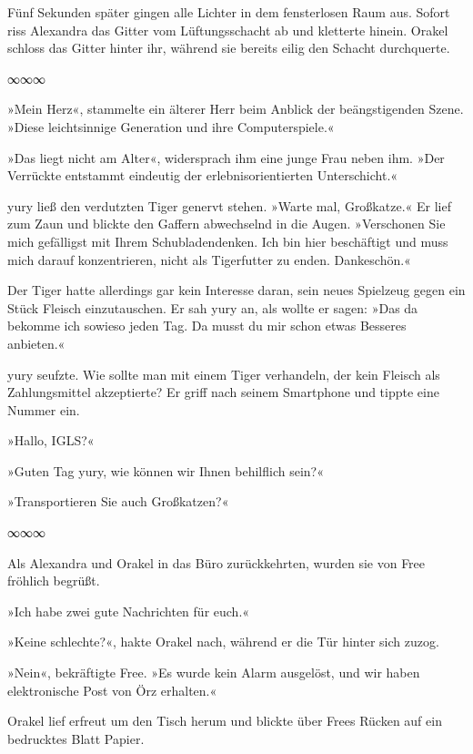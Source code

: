 Fünf Sekunden später gingen alle Lichter in dem fensterlosen Raum aus. Sofort riss Alexandra das Gitter vom Lüftungsschacht ab und kletterte hinein. Orakel schloss das Gitter hinter ihr, während sie bereits eilig den Schacht durchquerte.

\begin{center}
	∞∞∞
\end{center}

»Mein Herz«, stammelte ein älterer Herr beim Anblick der beängstigenden Szene. »Diese leichtsinnige Generation und ihre Computerspiele.«

»Das liegt nicht am Alter«, widersprach ihm eine junge Frau neben ihm. »Der Verrückte entstammt eindeutig der erlebnisorientierten Unterschicht.«

yury ließ den verdutzten Tiger genervt stehen. »Warte mal, Großkatze.« Er lief zum Zaun und blickte den Gaffern abwechselnd in die Augen. »Verschonen Sie mich gefälligst mit Ihrem Schubladendenken. Ich bin hier beschäftigt und muss mich darauf konzentrieren, nicht als Tigerfutter zu enden. Dankeschön.«

Der Tiger hatte allerdings gar kein Interesse daran, sein neues Spielzeug gegen ein Stück Fleisch einzutauschen. Er sah yury an, als wollte er sagen: »Das da bekomme ich sowieso jeden Tag. Da musst du mir schon etwas Besseres anbieten.«

yury seufzte. Wie sollte man mit einem Tiger verhandeln, der kein Fleisch als Zahlungsmittel akzeptierte? Er griff nach seinem Smartphone und tippte eine Nummer ein.

»Hallo, IGLS?«

»Guten Tag yury, wie können wir Ihnen behilflich sein?«

»Transportieren Sie auch Großkatzen?«

\begin{center}
	∞∞∞
\end{center}

Als Alexandra und Orakel in das Büro zurückkehrten, wurden sie von Free fröhlich begrüßt.

»Ich habe zwei gute Nachrichten für euch.«

»Keine schlechte?«, hakte Orakel nach, während er die Tür hinter sich zuzog.

»Nein«, bekräftigte Free. »Es wurde kein Alarm ausgelöst, und wir haben elektronische Post von Örz erhalten.«

Orakel lief erfreut um den Tisch herum und blickte über Frees Rücken auf ein bedrucktes Blatt Papier.

